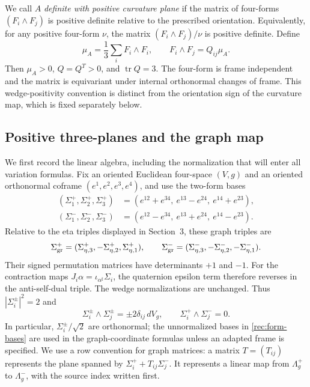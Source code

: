 \documentclass[11pt]{article}
\numberwithin{equation}{section}
\theoremstyle{definition}
\theoremstyle{remark}
\begin{document}
We call $A$ \emph{definite with positive curvature plane} if the matrix of four-forms
$(F_i\wedge F_j)$ is positive definite relative to the prescribed
orientation.  Equivalently, for any positive four-form $\nu$, the matrix
$(F_i\wedge F_j)/\nu$ is positive definite.  Define
\begin{equation}
 \mu_A=\frac13\sum_iF_i\wedge F_i,
 \qquad F_i\wedge F_j=Q_{ij}\mu_A.
 \label{rec:mu-Q}
\end{equation}
Then $\mu_A>0$, $Q=Q^T>0$, and $\operatorname{tr}Q=3$.  The four-form is frame independent and the matrix is equivariant under internal orthonormal changes of frame. This wedge-positivity convention is distinct from the orientation sign of the curvature map, which is fixed separately below.

\subsection{Positive three-planes and the graph map}

We first record the linear algebra, including the normalization that will
enter all variation formulas.  Fix an oriented Euclidean four-space
$(V,g)$ and an oriented orthonormal coframe $(e^1,e^2,e^3,e^4)$, and use
the two-form bases
\begin{equation}
 \begin{split}
 (\Sigma_1^+,\Sigma_2^+,\Sigma_3^+)
   &=(e^{12}+e^{34},\ e^{13}-e^{24},\ e^{14}+e^{23}),\\
 (\Sigma_1^-,\Sigma_2^-,\Sigma_3^-)
   &=(e^{12}-e^{34},\ e^{13}+e^{24},\ e^{14}-e^{23}).
 \end{split}
 \label{rec:form-bases}
\end{equation}
Relative to the eta triples displayed in Section~3, these graph triples are
\[
 \Sigma_{\rm gr}^+=(\Sigma_{\eta,3}^+,-\Sigma_{\eta,2}^+,\Sigma_{\eta,1}^+),
 \qquad
 \Sigma_{\rm gr}^-=(\Sigma_{\eta,3}^-,-\Sigma_{\eta,2}^-,-\Sigma_{\eta,1}^-).
\]
Their signed permutation matrices have determinants $+1$ and $-1$.
For the contraction maps $J_i\alpha=\iota_{\alpha^\sharp}\Sigma_i$,
the quaternion epsilon term therefore reverses in the anti-self-dual
triple. The wedge normalizations are unchanged. Thus $|\Sigma_i^\pm|^2=2$ and
\begin{equation}
 \Sigma_i^\pm\wedge\Sigma_j^\pm
    =\pm2\delta_{ij}\,dV_g,
 \qquad \Sigma_i^+\wedge\Sigma_j^-=0.
 \label{rec:wedge-normalization}
\end{equation}
In particular, $\Sigma_i^\pm/\sqrt2$ are orthonormal; the unnormalized
bases in \eqref{rec:form-bases} are used in the graph-coordinate
formulas unless an adapted frame is specified.
We use a row convention for graph matrices: a matrix $T=(T_{ij})$
represents the plane spanned by
$\Sigma_i^++T_{ij}\Sigma_j^-$.  It represents a linear map from
$\Lambda_g^+$ to $\Lambda_g^-$, with the source index written first.
\end{document}
